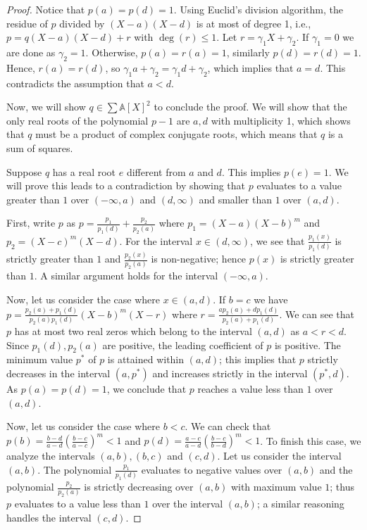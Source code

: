 \documentclass[preprint,12pt,authoryear]{elsarticle}
\newtheorem{proof}[theorem]{Proof}
\newcommand{\aX}{\mathbb{A}[X]}
\begin{document}
\begin{proof}
  Notice that $p(a) = p(d) = 1$. Using Euclid's division algorithm, the residue
  of $p$ divided by $(X-a)(X-d)$ is at most of degree 1, i.e.,
  $p = q(X-a)(X-d) + r$ with $\deg(r) \leq 1$. Let $r = \gamma_1 X +
  \gamma_2$. If $\gamma_1 = 0$ we are done as $\gamma_2 = 1$. Otherwise,
  $p(a) = r(a) = 1$, similarly $p(d) = r(d) = 1$. Hence, $r(a) = r(d)$, so
  $\gamma_1 a + \gamma_2 = \gamma_1 d + \gamma_2$, which implies that $a =
  d$. This contradicts the assumption that $a < d$.

  Now, we will show $q \in \sum{\aX}^2$ to conclude the proof. We will
  show that the only real roots of the polynomial $p - 1$ are $a, d$
  with multiplicity 1, which shows that $q$ must be a product of complex
  conjugate roots, which means that $q$ is a sum of squares.

  Suppose $q$ has a real root $e$ different from $a$ and $d$. This implies
 $p(e) = 1$. We will prove this leads to a contradiction by showing that $p$
  evaluates to a value greater than $1$ over $(-\infty, a)$ and $(d, \infty)$
  and smaller than $1$ over $(a, d)$.

  First, write $p$ as $p = \frac{p_1}{p_1(d)} + \frac{p_2}{p_2(a)}$ where
  $p_1 = (X-a)(X-b)^{m}$ and $p_2 = (X-c)^m(X-d)$. For the interval $x \in (d,
  \infty)$, we see that $\frac{p_1(x)}{p_1(d)}$ is strictly greater than $1$ and
  $\frac{p_2(x)}{p_2(a)}$ is non-negative; hence $p(x)$ is strictly greater than
  $1$. A similar argument holds for the interval $(-\infty, a)$.

  Now, let us consider the case where $x \in (a, d)$. If $b = c$ we have
 $p = \frac{p_2(a) + p_1(d)}{p_2(a) p_1(d)}(X-b)^{m}\left(X - r\right)$ where
  $r = \frac{a p_2(a) + d p_1(d)}{p_2(a) + p_1(d)}$. We can see that $p$ has at
  most two real zeros which belong to the interval $(a, d)$ as $a < r <
  d$. Since $p_1(d), p_2(a)$ are positive, the leading coefficient of $p$ is
  positive. The minimum value $p^{*}$ of $p$ is attained within
 $\left(a, d\right)$; this implies that $p$ strictly decreases in the
 interval $(a, p^{*})$ and increases strictly in the interval $(p^{*},
  d)$. As $p(a) = p(d) = 1$, we conclude that $p$ reaches a value less than
  $1$ over $(a, d)$.

  Now, let us consider the case where $b < c$. We can check that
  $p(b) = \frac{b-d}{a-d} (\frac{b-c}{a-c})^{m} < 1$ and
  $p(d) = \frac{a-c}{a-d} (\frac{b-c}{b-d})^{m} < 1$. To finish this case, we
  analyze the intervals $(a, b), (b, c)$ and $(c, d)$. Let us consider the
  interval $(a, b)$. The polynomial $\frac{p_1}{p_1(d)}$ evaluates to negative
  values over $(a, b)$ and the polynomial $\frac{p_2}{p_2(a)}$ is strictly
  decreasing over $(a, b)$ with maximum value $1$; thus $p$ evaluates to a value
  less than $1$ over the interval $(a, b)$; a similar reasoning handles the
  interval $(c, d)$.


\end{proof}
\end{document}

